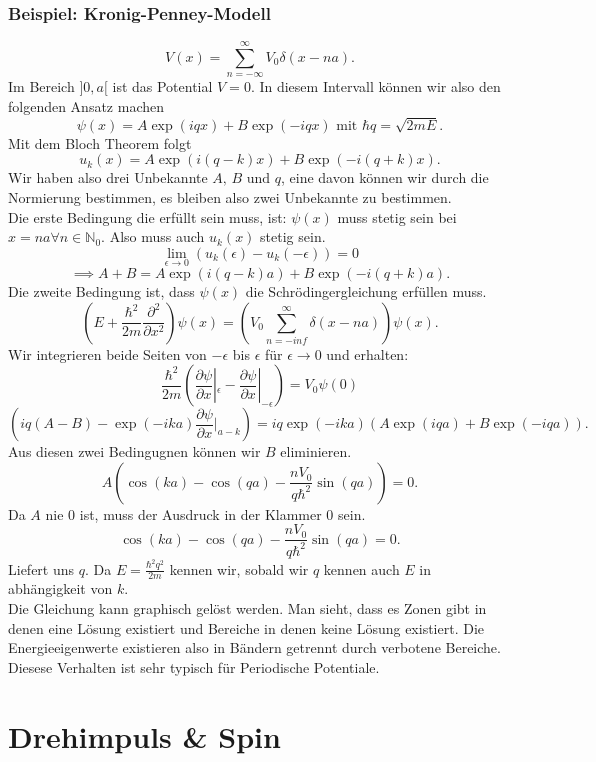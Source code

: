 \documentclass{report}
\begin{document}
\subsection{Beispiel: Kronig-Penney-Modell}
\[
	V(x) = \sum_{n=-\infty}^{\infty} V_0 \delta(x-na)
.\] Im Bereich $]0, a[$ ist das Potential  $V = 0$. In diesem Intervall können wir also den folgenden Ansatz machen \[
\psi(x) = A \exp(iqx) + B \exp(-iqx) \text{ mit } \hbar q = \sqrt{2mE} 
.\] Mit dem Bloch Theorem folgt \[
u_k(x) = A \exp(i\left( q-k \right) x) + B \exp(-i \left( q+k \right) x)
.\] Wir haben also drei Unbekannte $A \text{, } B \text{ und } q$, eine davon können wir durch die Normierung bestimmen, es bleiben also zwei Unbekannte zu bestimmen. \\
Die erste Bedingung die erfüllt sein muss, ist: $\psi(x)$ muss stetig sein bei $x = na \forall n \in \mathbb{N}_0$. Also muss auch $u_k(x)$ stetig sein. \[
	\lim_{\epsilon \to 0} \left( u_k(\epsilon) - u_k(-\epsilon) \right) = 0
\] \[
\implies A + B = A \exp(i (q-k) a) + B \exp(-i (q+k) a)
.\] Die zweite Bedingung ist, dass $\psi(x)$ die Schrödingergleichung erfüllen muss. \[
\left( E + \frac{\hbar^2}{2m} \frac{\partial^2}{\partial x^2} \right) \psi(x) = \left( V_0 \sum_{n=-inf}^{\infty} \delta(x-na) \right) \psi(x)
.\] Wir integrieren beide Seiten von $-\epsilon$ bis $\epsilon$ für $\epsilon \to 0$ und erhalten: \[
\frac{\hbar^2}{2m} \left( \frac{\partial \psi}{\partial x}|_{\epsilon} - \frac{\partial \psi}{\partial x}|_{-\epsilon} \right) = V_0 \psi(0)
\] \[
\left( iq(A-B) - \exp(-ika) \frac{\partial \psi}{\partial x}|_{a-k}  \right) = iq \exp(-ika) \left( A \exp(iqa) + B \exp(-iqa) \right) 
.\] Aus diesen zwei Bedingugnen können wir $B$ eliminieren. \[
A \left( \cos(ka) - \cos(qa) - \frac{nV_0}{q \hbar^2}\sin(qa) \right) = 0
.\] Da $A$ nie $0$ ist, muss der Ausdruck in der Klammer $0$ sein. \[
\cos(ka) - \cos(qa) - \frac{nV_0}{q \hbar^2}\sin(qa) = 0
.\] Liefert uns $q$. Da $E = \frac{\hbar^2 q^2}{2m}$ kennen wir, sobald wir  $q$ kennen auch $E$ in abhängigkeit von $k$. \\
Die Gleichung kann graphisch gelöst werden. Man sieht, dass es Zonen gibt in denen eine Lösung existiert und Bereiche in denen keine Lösung existiert. Die Energieeigenwerte existieren also in Bändern getrennt durch verbotene Bereiche. Diesese Verhalten ist sehr typisch für Periodische Potentiale.
\chapter{Drehimpuls \& Spin}
\end{document}
